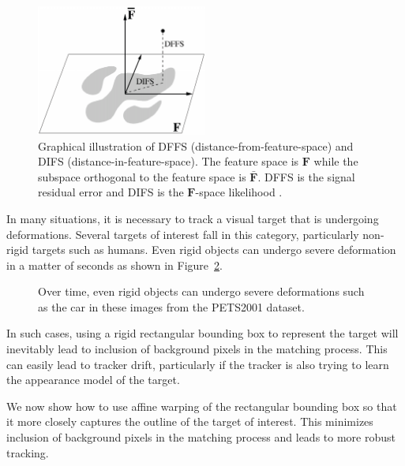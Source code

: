 								\begin{figure}[t]
								\centering
								\includegraphics[width=0.5\textwidth]{thesis/1998_JNL_ProbVisLearning_Moghaddam_fig3.png}
								\caption{Graphical illustration of DFFS (distance-from-feature-space) and DIFS (distance-in-feature-space).  The feature space is $\mathbf{F}$ while the subspace orthogonal to the feature space is $\bar{\mathbf{F}}$.  DFFS is the signal residual error and DIFS is the $\mathbf{F}$-space likelihood \cite{1997_JNL_EigenTRK_Moghaddam}.}
								\label{fig:1997_JNL_DIFSDFFS_Moghaddam}
								\end{figure}



In many situations, it is necessary to track a visual target that is undergoing deformations.  Several targets of interest fall in this category, particularly non-rigid targets such as humans.  Even rigid objects can undergo severe deformation in a matter of seconds as shown in Figure~\ref{Fig:PETS2001_deformation}.  


								\begin{figure}
								\centering
								\caption{Over time, even rigid objects can undergo severe deformations such as the car in these images from the PETS2001 dataset.}
								\label{Fig:PETS2001_deformation}
								\end{figure}

In such cases, using a rigid rectangular bounding box to represent the target will inevitably lead to inclusion of background pixels in the matching process.  This can easily lead to tracker drift, particularly if the tracker is also trying to learn the appearance model of the target.

We now show how to use affine warping of the rectangular bounding box so that it more closely captures the outline of the target of interest.  This minimizes inclusion of background pixels in the matching process and leads to more robust tracking.


